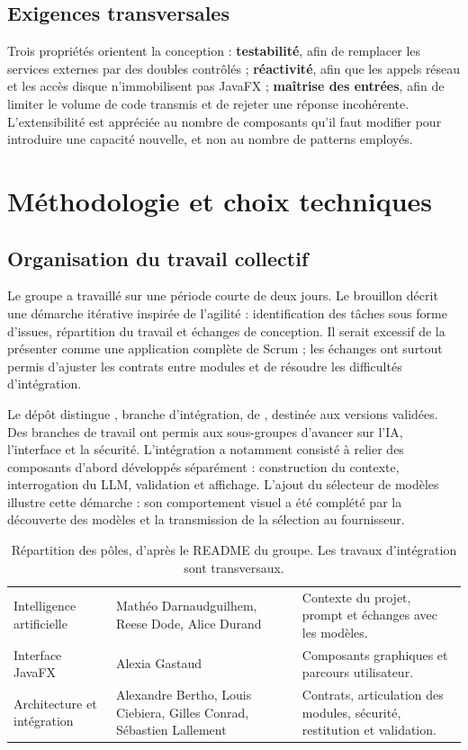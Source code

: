 \subsection{Exigences transversales}
Trois propriétés orientent la conception : \textbf{testabilité}, afin de remplacer les services externes par des doubles contrôlés ; \textbf{réactivité}, afin que les appels réseau et les accès disque n'immobilisent pas JavaFX ; \textbf{maîtrise des entrées}, afin de limiter le volume de code transmis et de rejeter une réponse incohérente. L'extensibilité est appréciée au nombre de composants qu'il faut modifier pour introduire une capacité nouvelle, et non au nombre de patterns employés.

\clearpage
\section{Méthodologie et choix techniques}
\label{sec:methode}
\subsection{Organisation du travail collectif}
Le groupe a travaillé sur une période courte de deux jours. Le brouillon décrit une démarche itérative inspirée de l'agilité : identification des tâches sous forme d'issues, répartition du travail et échanges de conception. Il serait excessif de la présenter comme une application complète de Scrum ; les échanges ont surtout permis d'ajuster les contrats entre modules et de résoudre les difficultés d'intégration.

Le dépôt distingue , branche d'intégration, de , destinée aux versions validées. Des branches de travail ont permis aux sous-groupes d'avancer sur l'IA, l'interface et la sécurité. L'intégration a notamment consisté à relier des composants d'abord développés séparément : construction du contexte, interrogation du LLM, validation et affichage. L'ajout du sélecteur de modèles illustre cette démarche : son comportement visuel a été complété par la découverte des modèles et la transmission de la sélection au fournisseur.

\begin{table}[H]
\small
\begin{tabularx}{\textwidth}{@{}P{32mm}YP{46mm}@{}}
\toprule
{} &  & \\
\midrule
Intelligence artificielle & Mathéo Darnaudguilhem, Reese Dode, Alice Durand & Contexte du projet, prompt et échanges avec les modèles.\\
Interface JavaFX & Alexia Gastaud & Composants graphiques et parcours utilisateur.\\
Architecture et intégration & Alexandre Bertho, Louis Ciebiera, Gilles Conrad, Sébastien Lallement & Contrats, articulation des modules, sécurité, restitution et validation.\\
\bottomrule
\end{tabularx}
\caption{Répartition des pôles, d'après le README du groupe. Les travaux d'intégration sont transversaux.}
\end{table}


